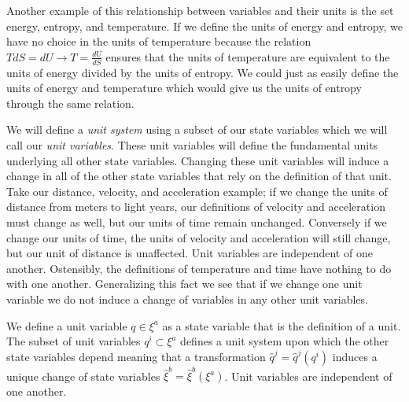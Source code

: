 \documentclass{article}
\begin{document}
	
	Another example of this relationship between variables and their units is the set energy, entropy, and temperature. If we define the units of energy and entropy, we have no choice in the units of temperature because the relation $T dS = dU \to T = \frac{dU}{dS}$ ensures that the units of temperature are equivalent to the units of energy divided by the units of entropy. We could just as easily define the units of energy and temperature which would give us the units of entropy through the same relation.
	
	 We will define a \textit{unit system} using a subset of our state variables which we will call our \textit{unit variables}. These unit variables will define the fundamental units underlying all other state variables. Changing these unit variables will induce a change in all of the other state variables that rely on the definition of that unit. Take our distance, velocity, and acceleration example; if we change the units of distance from meters to light years, our definitions of velocity and acceleration must change as well, but our units of time remain unchanged. Conversely if we change our units of time, the units of velocity and acceleration will still change, but our unit of distance is unaffected. Unit variables are independent of one another. Ostensibly, the definitions of temperature and time have nothing to do with one another.  Generalizing this fact we see that if we change one unit variable we do not induce a change of variables in any other unit variables.

\begin{defn}
	We define a unit variable $q \in \xi^a$ as a state variable that is the definition of a unit. The subset of unit variables $q^i \subset \xi^a$ defines a unit system upon which the other state variables depend meaning that a transformation $\hat{q}^j = \hat{q}^j(q^i)$ induces a unique change of state variables $\hat{\xi}^b = \hat{\xi}^b(\xi^a)$. Unit variables are independent of one another.
\end{defn}

	
\end{document}
